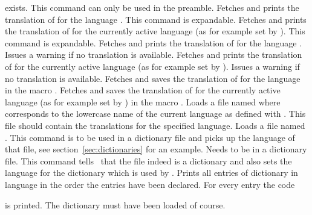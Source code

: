 \documentclass[DIV11,toc=index,toc=bib,numbers=noendperiod]{cnpkgdoc}
\newcommand*\unexpsign{{\tiny\FiveStar}}
\newcommand*\expsign{\textcolor{red}{{\tiny\FiveStar}}}
\renewcommand*\cnpkgdoctriangle{\unexpsign}
\newcommand*\expandable{%
  \def\cnpkgdoctriangle{%
    \expsign
    \gdef\cnpkgdoctriangle{\unexpsign}}}
\begin{document}
\begin{beschreibung}
   exists.  This command can only be used in the preamble.
 \expandable{}\newline
   Fetches and prints the translation of  for the language
   .  This command is expandable.
 \expandable{}\newline
   Fetches and prints the translation of  for the currently active
   language (as for example set by ).  This command is expandable.
 \newline
   Fetches and prints the translation of  for
   the language .  Issues a warning if no translation is
   available.
 \newline
   Fetches and prints the translation of  for
   the currently active language (as for example set by ).
   Issues a warning if no translation is available.
 \newline
   Fetches and saves the translation of  for the language
    in the macro .
 \newline
   Fetches and saves the translation of  for the currently active
   language (as for example set by ) in the macro .
 \newline
   Loads a file named  where  corresponds
   to the lowercase name of the current language as defined with
   . This file should contain the translations for the
   specified language.
 \newline
   Loads a file named .
 \newline
   This command is to be used in a dictionary file and picks up the language
   of that file, see section~\ref{sec:dictionaries} for an example.
 \newline
   Needs to be in a dictionary file.  This command tells \translations\ that
   the file indeed is a dictionary and also sets the language for the
   dictionary which is used by .
 \expandable{}\newline
   Prints all entries of dictionary  in
   language  in the order the entries have been declared.  For
   every entry the code\par
   \par
   is printed.  The dictionary must have been loaded of course.
\end{beschreibung}
\end{document}
